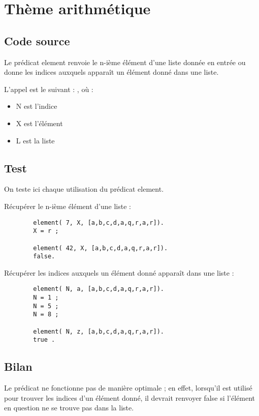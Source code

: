
\section{Thème arithmétique}

    \subsection{Code source}

        

	Le prédicat element renvoie le n-ième élément d'une liste donnée en
	entrée ou donne les indices auxquels apparaît un élément donné dans
	une liste.

	L'appel est le suivant : {}, où :
	\begin{itemize}
	    \item N est l'indice
	    \item X est l'élément
	    \item L est la liste
	\end{itemize}

    \subsection{Test}
	On teste ici chaque utilisation du prédicat element.

	Récupérer le n-ième élément d'une liste :

	\begin{verbatim}
	    element( 7, X, [a,b,c,d,a,q,r,a,r]).
	    X = r ;
	    
	    element( 42, X, [a,b,c,d,a,q,r,a,r]).
	    false.
	\end{verbatim}

	Récupérer les indices auxquels un élément donné apparaît dans une liste
	:

	\begin{verbatim}
	    element( N, a, [a,b,c,d,a,q,r,a,r]).
	    N = 1 ;
	    N = 5 ;
	    N = 8 ;
	    
	    element( N, z, [a,b,c,d,a,q,r,a,r]).
	    true .
	\end{verbatim}

    \subsection{Bilan}


    Le prédicat ne fonctionne pas de manière optimale ; en effet, lorsqu'il
    est utilisé pour trouver les indices d'un élément donné, il devrait
    renvoyer false si l'élément en question ne se trouve pas dans la liste.
